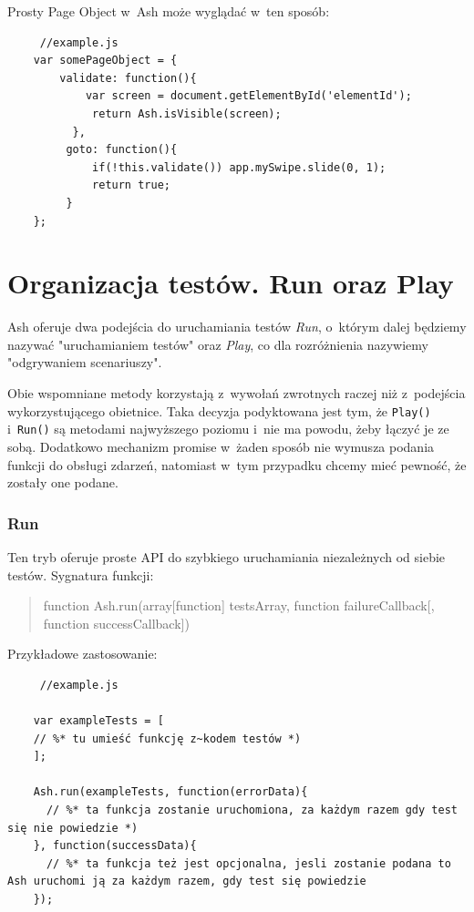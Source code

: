 \documentclass[brudnopis]{xmgr}
\begin{document}
Prosty Page Object w~Ash może wyglądać w~ten sposób:

\begin{lstlisting}
     //example.js
    var somePageObject = {
    	validate: function(){
      	    var screen = document.getElementById('elementId');
             return Ash.isVisible(screen);
          },
         goto: function(){
             if(!this.validate()) app.mySwipe.slide(0, 1);
             return true;
         }
    };
\end{lstlisting}

\section{Organizacja testów. Run oraz Play}

Ash oferuje dwa podejścia do uruchamiania testów \textit{Run}, o~którym dalej będziemy nazywać "uruchamianiem testów" oraz \textit{Play}, co dla rozróżnienia nazywiemy "odgrywaniem scenariuszy".

Obie wspomniane metody korzystają z~wywołań zwrotnych raczej niż z~podejścia wykorzystującego obietnice. Taka decyzja podyktowana jest tym, że \texttt{Play()} i~\texttt{Run()} są metodami najwyższego poziomu i~nie ma powodu, żeby łączyć je ze sobą. Dodatkowo mechanizm promise w~żaden sposób nie wymusza podania funkcji do obsługi zdarzeń, natomiast w~tym przypadku chcemy mieć pewność, że zostały one podane.  

\subsubsection{Run}

Ten tryb oferuje proste API do szybkiego uruchamiania niezależnych od siebie testów. Sygnatura funkcji: 

\begin{quote}
function Ash.run(array[function] testsArray, function failureCallback[, function successCallback]) 
\end{quote}

Przykładowe zastosowanie: 

\begin{lstlisting}
     //example.js

    var exampleTests = [
	// %* tu umieść funkcję z~kodem testów *)
    ];

    Ash.run(exampleTests, function(errorData){
      // %* ta funkcja zostanie uruchomiona, za każdym razem gdy test się nie powiedzie *)
    }, function(successData){
      // %* ta funkcja też jest opcjonalna, jesli zostanie podana to Ash uruchomi ją za każdym razem, gdy test się powiedzie
    });
\end{lstlisting}
\end{document}

